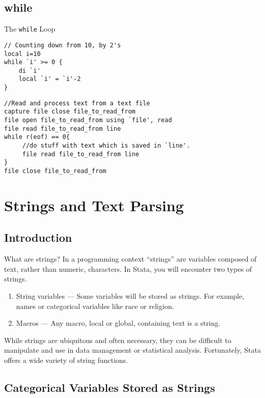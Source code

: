 \documentclass[fleqn, handout, 10pt]{beamer}
\def\lst{\lstinline}
\begin{document}
\subsection{while}
\begin{frame}[fragile]{The \lst=while= Loop}
    \begin{lstlisting}
// Counting down from 10, by 2's
local i=10
while `i' >= 0 {
    di `i'
    local `i' = `i'-2
}
    \end{lstlisting}

    \begin{lstlisting}
//Read and process text from a text file
capture file close file_to_read_from
file open file_to_read_from using `file', read
file read file_to_read_from line
while r(eof) == 0{
     //do stuff with text which is saved in `line'.
     file read file_to_read_from line
}
file close file_to_read_from
    \end{lstlisting}
\end{frame}
\section{Strings and Text Parsing}

\subsection{Introduction}
\begin{frame}{What are strings?}
    In a programming context ``strings'' are variables composed of text, rather than numeric, characters. In Stata, you will encounter two types of strings.
    \begin{enumerate}
        \item String variables --- Some variables will be stored as strings. For example, names or categorical variables like race or religion.
        \item Macros --- Any macro, local or global, containing text is a string.
    \end{enumerate}
    While strings are ubiquitous and often necessary, they can be difficult to manipulate and use in data management or statistical analysis. Fortunately, Stata offers a wide variety of string functions.
\end{frame}

\subsection{Categorical Variables Stored as Strings}
\end{document}

